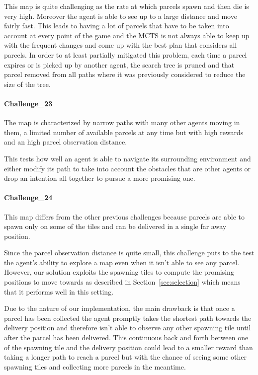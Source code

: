 This map is quite challenging as the rate at which parcels spawn and then die is very high. Moreover the agent is able to see up to a large distance and move fairly fast. This leads to having a lot of parcels that have to be taken into account at every point of the game and the MCTS is not always able to keep up with the frequent changes and come up with the best plan that considers all parcels. In order to at least partially mitigated this problem, each time a parcel expires or is picked up by another agent, the search tree is pruned and that parcel removed from all paths where it was previously considered to reduce the size of the tree.


\paragraph{Challenge\_23} The map is characterized by narrow paths with many other agents moving in them, a limited number of available parcels at any time but with high rewards and an high parcel observation distance.

This tests how well an agent is able to navigate its surrounding environment and either modify its path to take into account the obstacles that are other agents or drop an intention all together to pursue a more promising one.


\paragraph{Challenge\_24} This map differs from the other previous challenges because parcels are able to spawn only on some of the tiles and can be delivered in a single far away position.

Since the parcel observation distance is quite small, this challenge puts to the test the agent's ability to explore a map even when it isn't able to see any parcel. However, our solution exploits the spawning tiles to compute the promising positions to move towards as described in Section~\ref{sec:selection} which means that it performs well in this setting.

Due to the nature of our implementation, the main drawback is that once a parcel has been collected the agent promptly takes the shortest path towards the delivery position and therefore isn't able to observe any other spawning tile until after the parcel has been delivered. This continuous back and forth between one of the spawning tile and the delivery position could lead to a smaller reward than taking a longer path to reach a parcel but with the chance of seeing some other spawning tiles and collecting more parcels in the meantime.


